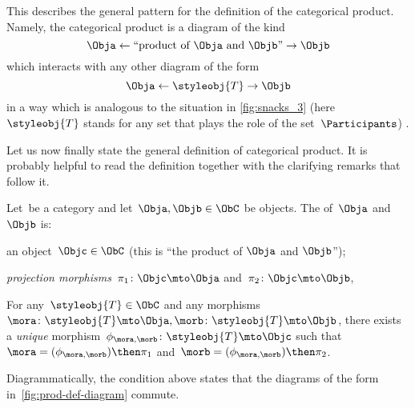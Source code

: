 This describes the general pattern for the definition of the categorical product. Namely, the categorical product is a diagram of the kind
\begin{equation}
    \label{eq:prod-inline-generic-diagram}
    \Obja \leftarrow \text{``product of } \Obja \text{ and } \Objb \text{''}  \rightarrow \Objb
\end{equation}
which interacts with any other diagram of the form
\begin{equation}
    \label{eq:prod-inline-test-diagram}
    \Obja \leftarrow \styleobj{T} \rightarrow \Objb
\end{equation}
in a way which is analogous to the situation in \cref{fig:snacks_3} (here~$\styleobj{T}$ stands for any set that plays the role of the set~$\Participants$) .

Let us now finally state the general definition of categorical product. It is probably helpful to read the definition together with the clarifying remarks that follow it.


\begin{ctdefinition}
    \label{def:categorical-product}
    Let~\CatC be a category and let~$\Obja, \Objb \in \ObC$ be objects. The \emph{} of~$\Obja$ and~$\Objb$ is: \\
    \constit
    \begin{compactenum}
        \item an object~$\Objc \in \ObC$ (this is ``the product of $\Obja$  and $\Objb$'');
        \item \emph{projection morphisms}~$\pi_1 \colon \Objc \mto \Obja$ and~$\pi_2 \colon \Objc \mto \Objb$,
    \end{compactenum}
    \condit
    \begin{compactenum}
        \item For any~$\styleobj{T} \in \ObC$ and any morphisms~$\mora \colon \styleobj{T} \mto \Obja, \morb \colon \styleobj{T} \mto \Objb$, there exists a \emph{unique} morphism~$\phi_{\mora,\morb} \colon \styleobj{T} \mto \Objc$ such that~$\mora = (\phi_{\mora,
        \morb})\then \pi_1$ and~$\morb=(\phi_{\mora, \morb})\then \pi_2$.
    \end{compactenum}
\end{ctdefinition}

\begin{marginfigure}
    \centering
    \caption{}
    \label{fig:prod-def-diagram}
\end{marginfigure}
\begin{remark}
    \label{re:prod-comm-diag}
    Diagrammatically, the condition above states that the diagrams of the form
    in~\cref{fig:prod-def-diagram} commute.
\end{remark}

